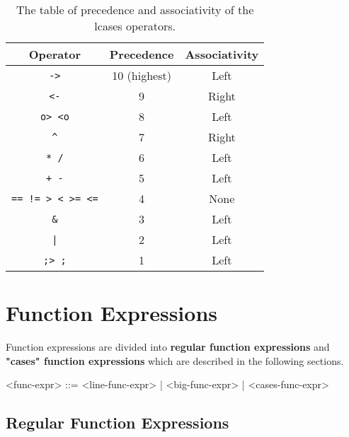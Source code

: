 \documentclass[diploma]{softlab-thesis}
\begin{document}
\begin{table}[h]

\caption{ The table of precedence and associativity of the lcases operators.  }

\begin{center}
\begin{tabular}{ |c|c|c| }
\hline
Operator & Precedence & Associativity
\\
\hline
\hline
\verb|->| & 10 (highest) & Left
\\
\hline
\verb|<-| & 9 & Right
\\
\hline
\verb|o> <o| & 8 & Left
\\
\hline
\verb|^| & 7 & Right
\\
\hline
\verb|* /| & 6 & Left
\\
\hline
\verb|+ -| & 5 & Left
\\
\hline
\verb|== != > < >= <=| & 4 & None
\\
\hline
\verb|&| & 3 & Left
\\
\hline
\texttt{|} & 2 & Left
\\
\hline
\verb|;> ;| & 1 & Left
\\
\hline
\end{tabular}
\end{center}

\label{table:precassoc}

\end{table}

\newpage
\section{Function Expressions}
\label{subsec:funcexprs}

Function expressions are divided into \textbf{regular function expressions} and
\textbf{"cases" function expressions} which are described in the following
sections.
\begin{grammar}
<func-expr> ::= <line-func-expr> | <big-func-expr> | <cases-func-expr>
\end{grammar}

\subsection{Regular Function Expressions}
\end{document}
